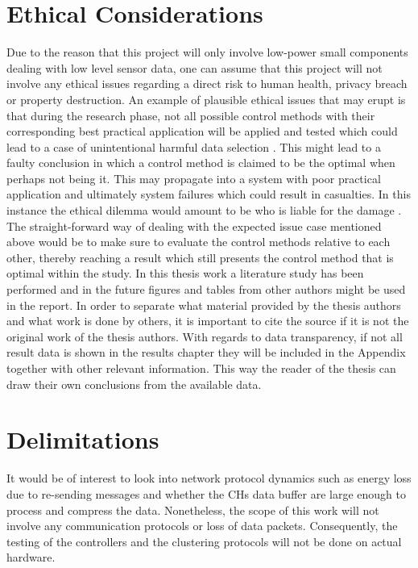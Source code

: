 \section{Ethical Considerations}
\noindent Due to the reason that this project will only involve low-power small components dealing with low level sensor data, one can assume that this project will not involve any ethical issues regarding a direct risk to human health, privacy breach or property destruction.
\newline\newline
An example of plausible ethical issues that may erupt is that during the research phase, not all possible control methods with their corresponding best practical application will be applied and tested which could lead to a case of unintentional harmful data selection \cite{dataSelection}. This might lead to a faulty conclusion in which a control method is claimed to be the optimal when perhaps not being it. This may propagate into a system with poor practical application and ultimately system failures which could result in casualties. In this instance the ethical dilemma would amount to be who is liable for the damage \cite{epstein1997case}. The straight-forward way of dealing with the expected issue case mentioned above would be to make sure to evaluate the control methods relative to each other, thereby reaching a result which still presents the control method that is optimal within the study.
\newline \newline
\noindent In this thesis work a literature study has been performed and in the future figures and tables from other authors might be used in the report. In order to separate what material provided by the thesis authors and what work is done by others, it is important to cite the source if it is not the original work of the thesis authors.
\newline \newline 
\noindent With regards to data transparency, if not all result data is shown in the results chapter they will be included in the Appendix together with other relevant information. This way the reader of the thesis can draw their own conclusions from the available data. 

\section{Delimitations}
It would be of interest to look into network protocol dynamics such as energy loss due to re-sending messages and whether the CHs data buffer are large enough to process and compress the data. Nonetheless, the scope of this work will not involve any communication protocols or loss of data packets. Consequently, the testing of the controllers and the clustering protocols will not be done on actual hardware.\newline

